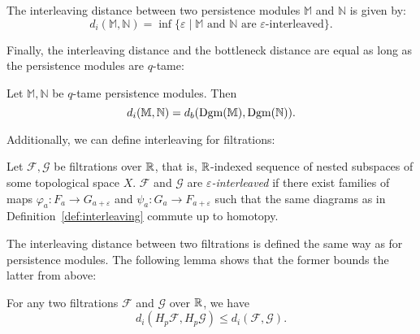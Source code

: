 \begin{definition}
    The interleaving distance between two persistence modules $\mathbb{M}$ and
    $\mathbb{N}$ is given by:
    \begin{equation}
        d_i(\mathbb{M}, \mathbb{N}) = \inf \{\varepsilon \mid \text{$\mathbb{M}$ and $\mathbb{N}$ are $\varepsilon$-interleaved}\}.
    \end{equation}
\end{definition}

Finally, the interleaving distance and the bottleneck distance are equal as long
as the persistence modules are $q$-tame:
\begin{theorem}
    \label{thm:isometry}
    Let $\mathbb{M}, \mathbb{N}$ be $q$-tame persistence modules. Then
    \begin{equation}
        d_i(\mathbb{M}, \mathbb{N}) = d_b(\operatorname{Dgm}(\mathbb{M}), \operatorname{Dgm}(\mathbb{N})).
    \end{equation}
\end{theorem}

Additionally, we can define interleaving for filtrations:
\begin{definition}
    Let $\mathcal{F}, \mathcal{G}$ be filtrations over $\mathbb{R}$, that is,
    $\mathbb{R}$-indexed sequence of nested subspaces of some topological space $X$.
    $\mathcal{F}$ and $\mathcal{G}$ are \emph{$\varepsilon$-interleaved}
    if there exist families of maps $\varphi_a : F_a \to G_{a + \varepsilon}$
    and $\psi_a : G_a \to F_{a + \varepsilon}$ such that the same diagrams as in
    Definition~\ref{def:interleaving} commute up to homotopy.
\end{definition}
The interleaving distance between two filtrations is defined the same way as for
persistence modules. The following lemma shows that the former bounds the latter
from above:
\begin{lemma}
    \label{lem:interleaving_distance}
    For any two filtrations $\mathcal{F}$ and $\mathcal{G}$ over $\mathbb{R}$, we
    have
    \begin{equation}
        d_i(H_p \mathcal{F}, H_p \mathcal{G}) \leq d_i(\mathcal{F}, \mathcal{G}).
    \end{equation}
\end{lemma}

